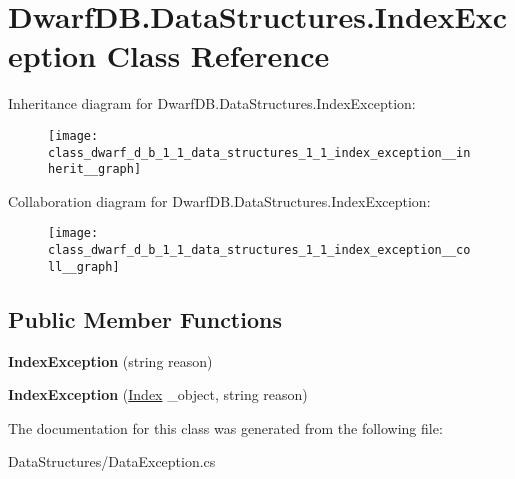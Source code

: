 \hypertarget{class_dwarf_d_b_1_1_data_structures_1_1_index_exception}{
\section{DwarfDB.DataStructures.IndexException Class Reference}
\label{class_dwarf_d_b_1_1_data_structures_1_1_index_exception}
}


Inheritance diagram for DwarfDB.DataStructures.IndexException:
\nopagebreak
\begin{figure}[H]
\begin{center}
\leavevmode
\texttt{[image: class\_dwarf\_d\_b\_1\_1\_data\_structures\_1\_1\_index\_exception\_\_inherit\_\_graph]}
\end{center}
\end{figure}


Collaboration diagram for DwarfDB.DataStructures.IndexException:
\nopagebreak
\begin{figure}[H]
\begin{center}
\leavevmode
\texttt{[image: class\_dwarf\_d\_b\_1\_1\_data\_structures\_1\_1\_index\_exception\_\_coll\_\_graph]}
\end{center}
\end{figure}
\subsection*{Public Member Functions}
\begin{DoxyCompactItemize}
\item 
\hypertarget{class_dwarf_d_b_1_1_data_structures_1_1_index_exception_aee03e81543a53f20ddcca303c79018ad}{
{\bfseries IndexException} (string reason)}
\label{class_dwarf_d_b_1_1_data_structures_1_1_index_exception_aee03e81543a53f20ddcca303c79018ad}

\item 
\hypertarget{class_dwarf_d_b_1_1_data_structures_1_1_index_exception_a2c9bcab774735ac2406f852f55647d46}{
{\bfseries IndexException} (\hyperlink{class_dwarf_d_b_1_1_data_structures_1_1_index}{Index} \_\-object, string reason)}
\label{class_dwarf_d_b_1_1_data_structures_1_1_index_exception_a2c9bcab774735ac2406f852f55647d46}

\end{DoxyCompactItemize}


The documentation for this class was generated from the following file:\begin{DoxyCompactItemize}
\item 
DataStructures/DataException.cs\end{DoxyCompactItemize}
